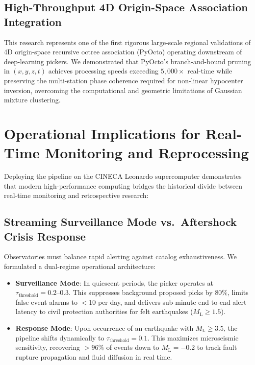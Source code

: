 \subsection{High-Throughput 4D Origin-Space Association Integration}
This research represents one of the first rigorous large-scale
regional validations of 4D origin-space recursive octree association
(\ac{PyOcto}) operating downstream of deep-learning pickers. We
demonstrated that PyOcto's branch-and-bound pruning in $(x, y, z, t)$ achieves
processing speeds exceeding $5{,}000\times$ real-time
while preserving the multi-station phase coherence required for
non-linear hypocenter inversion, overcoming the computational and
geometric limitations of Gaussian mixture clustering.

\section{Operational Implications for Real-Time Monitoring and Reprocessing}
\label{sec:conclusion_operations}

Deploying the pipeline on the \ac{CINECA} Leonardo supercomputer
demonstrates that modern high-performance computing bridges the
historical divide between real-time monitoring and retrospective research:

\subsection{Streaming Surveillance Mode vs.\ Aftershock Crisis Response}
Observatories must balance rapid alerting against catalog
exhaustiveness. We formulated a dual-regime operational architecture:
\begin{itemize}
  \item \textbf{Surveillance Mode}: In quiescent periods, the picker
    operates at $\tau_{\mathrm{threshold}} = 0.2\text{--}0.3$. This
    suppresses background proposed picks by $80\%$, limits false
    event alarms to $< 10$ per day, and delivers sub-minute
    end-to-end alert latency to civil protection authorities for
    felt earthquakes ($M_{\mathrm{L}} \ge 1.5$).
  \item \textbf{Response Mode}: Upon occurrence of an earthquake
    with $M_{\mathrm{L}} \ge 3.5$, the pipeline shifts dynamically
    to $\tau_{\mathrm{threshold}} = 0.1$. This maximizes
    microseismic sensitivity, recovering $> 96\%$ of events down to
    $M_{\mathrm{L}} = -0.2$ to track fault rupture propagation and
    fluid diffusion in real time.
\end{itemize}

